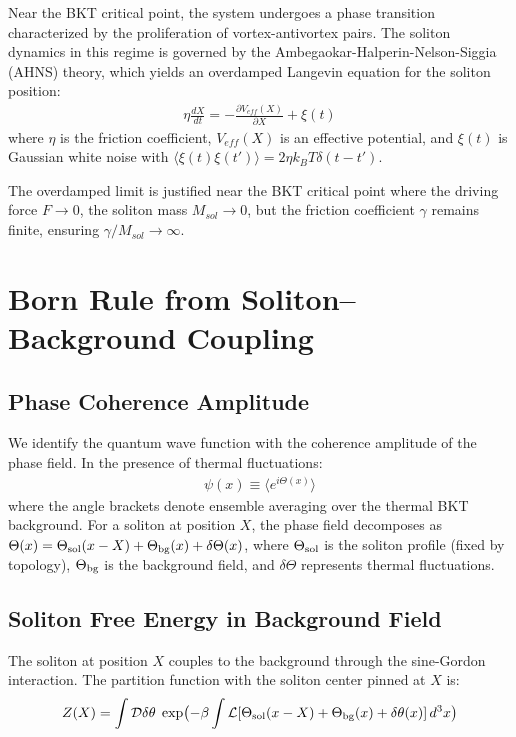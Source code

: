 ﻿\documentclass[twocolumn,showpacs,preprintnumbers,amsmath,amssymb,prd]{revtex4-2}
\begin{document}
Near the BKT critical point, the system undergoes a phase transition characterized by the proliferation of vortex-antivortex pairs. The soliton dynamics in this regime is governed by the Ambegaokar-Halperin-Nelson-Siggia (AHNS) theory, which yields an overdamped Langevin equation for the soliton position:
\begin{align}
\eta \frac{dX}{dt} = -\frac{\partial V_{eff}(X)}{\partial X} + \xi(t)
\label{eq:langevin}
\end{align}
where $\eta$ is the friction coefficient, $V_{eff}(X)$ is an effective potential, and $\xi(t)$ is Gaussian white noise with $\langle\xi(t)\xi(t')\rangle = 2\eta k_B T \delta(t-t')$.

The overdamped limit is justified near the BKT critical point where the driving force $F \to 0$, the soliton mass $M_{sol} \to 0$, but the friction coefficient $\gamma$ remains finite, ensuring $\gamma/M_{sol} \to \infty$.

\section{Born Rule from Soliton--Background Coupling}
\label{sec:born}

\subsection{Phase Coherence Amplitude}

We identify the quantum wave function with the coherence amplitude of the phase field. In the presence of thermal fluctuations:
\begin{align}
\psi(x) \equiv \langle e^{i\Theta(x)}\rangle
\label{eq:coherence}
\end{align}
where the angle brackets denote ensemble averaging over the thermal BKT background. For a soliton at position $X$, the phase field decomposes as $\Theta(x) = \Theta_{\rm sol}(x-X) + \Theta_{\rm bg}(x) + \delta\Theta(x)$, where $\Theta_{\rm sol}$ is the soliton profile (fixed by topology), $\Theta_{\rm bg}$ is the background field, and $\delta\Theta$ represents thermal fluctuations.

\subsection{Soliton Free Energy in Background Field}

The soliton at position $X$ couples to the background through the sine-Gordon interaction. The partition function with the soliton center pinned at $X$ is:
\begin{align}
Z(X) = \int \mathcal{D}\delta\theta \; \exp\bigl(-\beta \int \mathcal{L}[\Theta_{\rm sol}(x-X) + \Theta_{\rm bg}(x) + \delta\theta(x)] \, d^3x\bigr)
\end{align}
\end{document}
